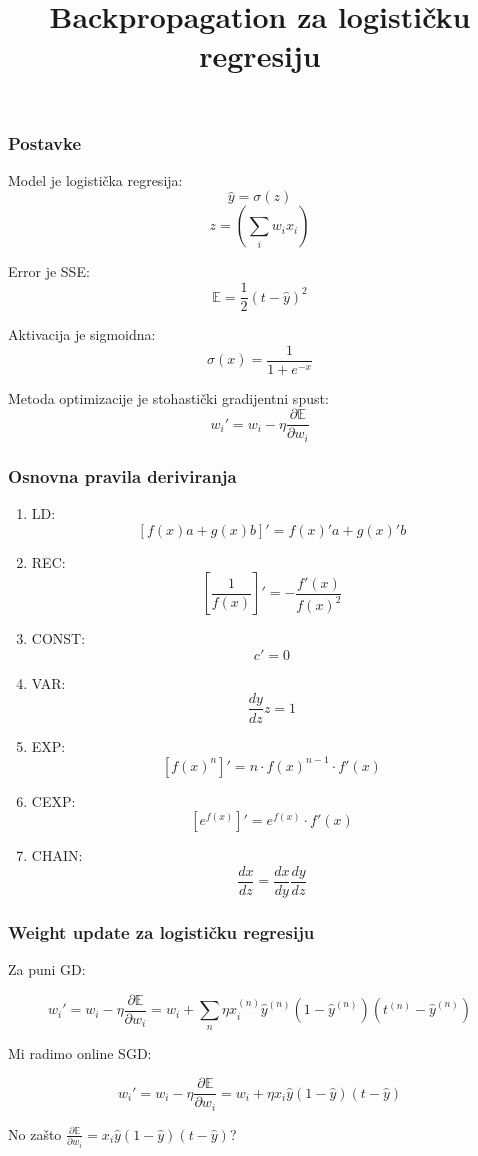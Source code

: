 \documentclass{beamer}
\title{Backpropagation za logisti\v cku regresiju}
\begin{document}
\frame{\titlepage}


\begin{frame}
\frametitle{Postavke}
    \item Model je logisti\v cka regresija: $$\hat{y}=\sigma(z)$$ $$z=(\sum_i w_ix_i)$$\pause
    \item Error je SSE: $$\mathbb{E}=\frac{1}{2} (t-\hat{y})^2$$\pause
    \item Aktivacija je sigmoidna: $$\sigma(x)=\frac{1}{1+e^{-x}}$$\pause
    \item Metoda optimizacije je stohasti\v cki gradijentni spust: $$w_i'=w_i - \eta \frac{\partial \mathbb{E}}{\partial w_i}$$ 
\end{frame}

\begin{frame}
\frametitle{Osnovna pravila deriviranja}
\begin{enumerate}
    \item LD: $$[f(x)a+g(x)b]' = f(x)'a+g(x)'b$$
    \item REC: $$[\frac{1}{f(x)}]'= - \frac{f'(x)}{f(x)^2}$$
    \item CONST: $$c'=0$$
    \item VAR: $$\frac{dy}{dz}z=1$$
    \item EXP: $$[f(x)^n]'=n\cdot f(x)^{n-1} \cdot f'(x)$$
    \item CEXP: $$[e^{f(x)}]'=e^{f(x)}\cdot f'(x)$$
    \item CHAIN: $$\frac{dx}{dz}=\frac{dx}{dy}\frac{dy}{dz}$$
    \end{enumerate}
\end{frame}



\begin{frame}
\frametitle{Weight update za logisti\v cku regresiju}

Za puni GD:

$$w_i'=w_i-\eta\frac{\partial\mathbb{E}}{\partial w_i}=w_i + \sum_n\eta x_i^{(n)}\hat{y}^{(n)}(1-\hat{y}^{(n)})(t^{(n)}-\hat{y}^{(n)})$$ \pause

Mi radimo online SGD:

$$w_i'=w_i-\eta\frac{\partial\mathbb{E}}{\partial w_i}=w_i + \eta x_i\hat{y}(1-\hat{y})(t-\hat{y})$$\pause

\alert{No za\v sto $\frac{\partial\mathbb{E}}{\partial w_i}= x_i\hat{y}(1-\hat{y})(t-\hat{y})$?}

\end{frame}
\end{document}
